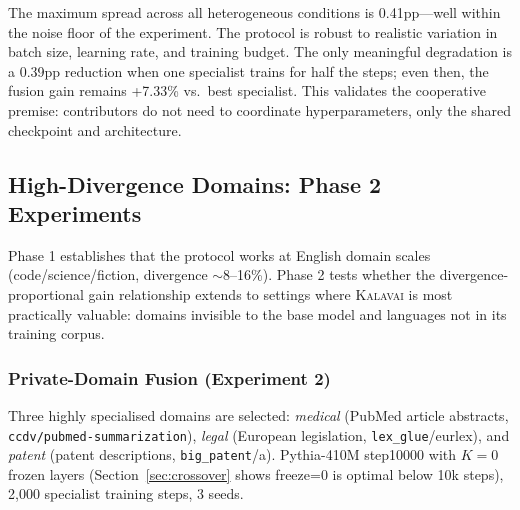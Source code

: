 \documentclass{article}
\newcommand{\kalavai}{\textsc{Kalavai}\xspace}
\begin{document}
The maximum spread across all heterogeneous conditions is 0.41pp---well within the noise floor of the experiment. The protocol is robust to realistic variation in batch size, learning rate, and training budget. The only meaningful degradation is a 0.39pp reduction when one specialist trains for half the steps; even then, the fusion gain remains +7.33\% vs.\ best specialist. This validates the cooperative premise: contributors do not need to coordinate hyperparameters, only the shared checkpoint and architecture.

\subsection{High-Divergence Domains: Phase 2 Experiments}
\label{sec:phase2}

Phase 1 establishes that the protocol works at English domain scales (code/science/fiction, divergence $\sim$8--16\%). Phase 2 tests whether the divergence-proportional gain relationship extends to settings where \kalavai is most practically valuable: domains invisible to the base model and languages not in its training corpus.

\subsubsection{Private-Domain Fusion (Experiment 2)}
\label{sec:phase2_private}

Three highly specialised domains are selected: \emph{medical} (PubMed article abstracts, \texttt{ccdv/pubmed-summarization}), \emph{legal} (European legislation, \texttt{lex\_glue}/eurlex), and \emph{patent} (patent descriptions, \texttt{big\_patent}/a). Pythia-410M step10000 with $K=0$ frozen layers (Section~\ref{sec:crossover} shows freeze=0 is optimal below 10k steps), 2,000 specialist training steps, 3 seeds.
\end{document}
